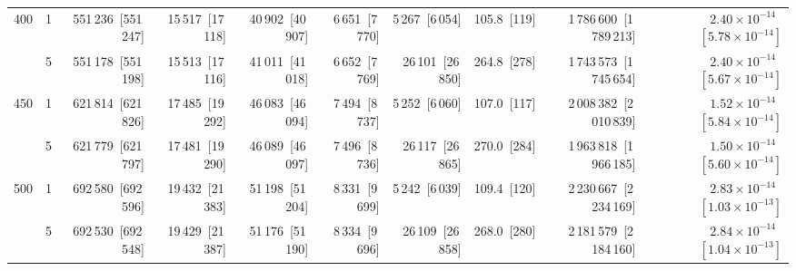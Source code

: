 \begin{tabular}{llrrrrrrrr}
\cline{1-10}
\multirow[t]{2}{*}{400} & 1 & 551\,236~{\footnotesize[551\,247]} & 15\,517~{\footnotesize[17\,118]} & 40\,902~{\footnotesize[40\,907]} & 6\,651~{\footnotesize[7\,770]} & 5\,267~{\footnotesize[6\,054]} & 105.8~{\footnotesize[119]} & 1\,786\,600~{\footnotesize[1\,789\,213]} & $2.40\!\times\!10^{-14}$~{\footnotesize $[5.78\!\times\!10^{-14}]$} \\
 & 5 & 551\,178~{\footnotesize[551\,198]} & 15\,513~{\footnotesize[17\,116]} & 41\,011~{\footnotesize[41\,018]} & 6\,652~{\footnotesize[7\,769]} & 26\,101~{\footnotesize[26\,850]} & 264.8~{\footnotesize[278]} & 1\,743\,573~{\footnotesize[1\,745\,654]} & $2.40\!\times\!10^{-14}$~{\footnotesize $[5.67\!\times\!10^{-14}]$} \\
\cline{1-10}
\multirow[t]{2}{*}{450} & 1 & 621\,814~{\footnotesize[621\,826]} & 17\,485~{\footnotesize[19\,292]} & 46\,083~{\footnotesize[46\,094]} & 7\,494~{\footnotesize[8\,737]} & 5\,252~{\footnotesize[6\,060]} & 107.0~{\footnotesize[117]} & 2\,008\,382~{\footnotesize[2\,010\,839]} & $1.52\!\times\!10^{-14}$~{\footnotesize $[5.84\!\times\!10^{-14}]$} \\
 & 5 & 621\,779~{\footnotesize[621\,797]} & 17\,481~{\footnotesize[19\,290]} & 46\,089~{\footnotesize[46\,097]} & 7\,496~{\footnotesize[8\,736]} & 26\,117~{\footnotesize[26\,865]} & 270.0~{\footnotesize[284]} & 1\,963\,818~{\footnotesize[1\,966\,185]} & $1.50\!\times\!10^{-14}$~{\footnotesize $[5.60\!\times\!10^{-14}]$} \\
\cline{1-10}
\multirow[t]{2}{*}{500} & 1 & 692\,580~{\footnotesize[692\,596]} & 19\,432~{\footnotesize[21\,383]} & 51\,198~{\footnotesize[51\,204]} & 8\,331~{\footnotesize[9\,699]} & 5\,242~{\footnotesize[6\,039]} & 109.4~{\footnotesize[120]} & 2\,230\,667~{\footnotesize[2\,234\,169]} & $2.83\!\times\!10^{-14}$~{\footnotesize $[1.03\!\times\!10^{-13}]$} \\
 & 5 & 692\,530~{\footnotesize[692\,548]} & 19\,429~{\footnotesize[21\,387]} & 51\,176~{\footnotesize[51\,190]} & 8\,334~{\footnotesize[9\,696]} & 26\,109~{\footnotesize[26\,858]} & 268.0~{\footnotesize[280]} & 2\,181\,579~{\footnotesize[2\,184\,160]} & $2.84\!\times\!10^{-14}$~{\footnotesize $[1.04\!\times\!10^{-13}]$} \\
\cline{1-10}
\bottomrule
\end{tabular}
